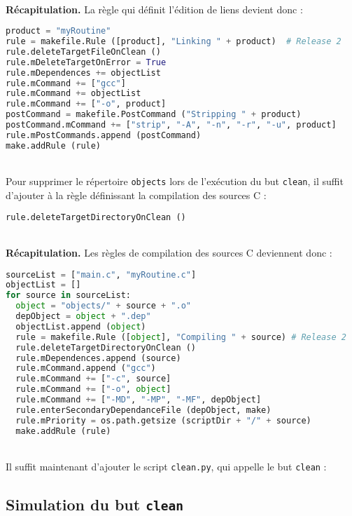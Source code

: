 \documentclass[a4paper,11pt]{extarticle}
\begin{document}
~\\{\bf Récapitulation.} La règle qui définit l'édition de liens devient donc :
\begin{lstlisting}[language=py]
product = "myRoutine"
rule = makefile.Rule ([product], "Linking " + product)  # Release 2
rule.deleteTargetFileOnClean ()
rule.mDeleteTargetOnError = True
rule.mDependences += objectList
rule.mCommand += ["gcc"]
rule.mCommand += objectList
rule.mCommand += ["-o", product]
postCommand = makefile.PostCommand ("Stripping " + product)
postCommand.mCommand += ["strip", "-A", "-n", "-r", "-u", product]
rule.mPostCommands.append (postCommand)
make.addRule (rule)
\end{lstlisting}


~\\Pour supprimer le répertoire \texttt{objects} lors de l'exécution du but \texttt{clean}, il suffit d'ajouter à la règle définissant la compilation des sources C :

\begin{lstlisting}[language=py]
  rule.deleteTargetDirectoryOnClean ()
\end{lstlisting}

~\\{\bf Récapitulation.} Les règles de compilation des sources C deviennent donc :
\begin{lstlisting}[language=py]
sourceList = ["main.c", "myRoutine.c"]
objectList = []
for source in sourceList:
  object = "objects/" + source + ".o"
  depObject = object + ".dep"
  objectList.append (object)
  rule = makefile.Rule ([object], "Compiling " + source) # Release 2
  rule.deleteTargetDirectoryOnClean ()
  rule.mDependences.append (source)
  rule.mCommand.append ("gcc")
  rule.mCommand += ["-c", source]
  rule.mCommand += ["-o", object]
  rule.mCommand += ["-MD", "-MP", "-MF", depObject]
  rule.enterSecondaryDependanceFile (depObject, make)
  rule.mPriority = os.path.getsize (scriptDir + "/" + source)
  make.addRule (rule)
\end{lstlisting}

~\\Il suffit maintenant d'ajouter le script \texttt{clean.py}, qui appelle le but \texttt{clean} :



\subsection{Simulation du but \texttt{clean}}\label{simulationButClean}
\end{document}
